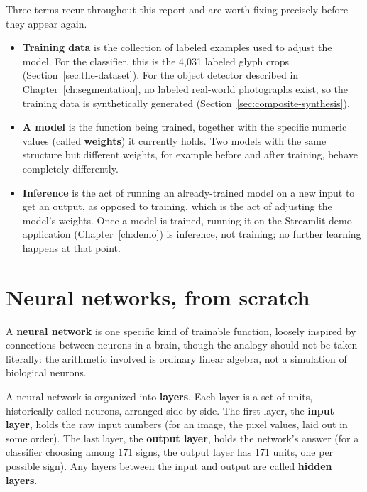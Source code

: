 \documentclass[11pt,a4paper]{report}
\begin{document}
Three terms recur throughout this report and are worth fixing precisely
before they appear again.

\begin{itemize}
  \item \textbf{Training data} is the collection of labeled examples used
    to adjust the model. For the classifier, this is the 4{,}031 labeled
    glyph crops (Section~\ref{sec:the-dataset}). For the object detector
    described in Chapter~\ref{ch:segmentation}, no labeled real-world
    photographs exist, so the training data is synthetically generated
    (Section~\ref{sec:composite-synthesis}).
  \item \textbf{A model} is the function being trained, together with the
    specific numeric values (called \textbf{weights}) it currently holds.
    Two models with the same structure but different weights, for example
    before and after training, behave completely differently.
  \item \textbf{Inference} is the act of running an already-trained model on
    a new input to get an output, as opposed to training, which is the act
    of adjusting the model's weights. Once a model is trained, running it
    on the Streamlit demo application (Chapter~\ref{ch:demo}) is inference,
    not training; no further learning happens at that point.
\end{itemize}

\section{Neural networks, from scratch}
\label{sec:neural-networks}

A \textbf{neural network} is one specific kind of trainable function, loosely
inspired by connections between neurons in a brain, though the analogy
should not be taken literally: the arithmetic involved is ordinary linear
algebra, not a simulation of biological neurons.

A neural network is organized into \textbf{layers}. Each layer is a set of
units, historically called neurons, arranged side by side. The first layer,
the \textbf{input layer}, holds the raw input numbers (for an image, the
pixel values, laid out in some order). The last layer, the \textbf{output
layer}, holds the network's answer (for a classifier choosing among 171
signs, the output layer has 171 units, one per possible sign). Any layers
between the input and output are called \textbf{hidden layers}.
\end{document}
